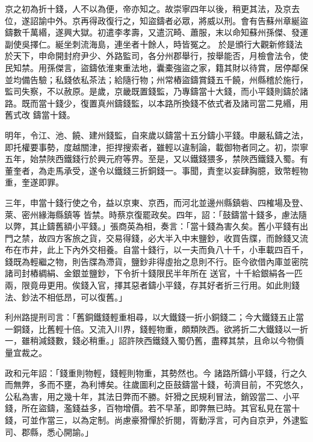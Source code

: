 \begin{pinyinscope}
 京之初為折十錢，人不以為便，帝亦知之。故崇寧四年以後，稍更其法，及京去位，遂詔諭中外。京再得政復行之，知盜鑄者必眾，將威以刑。會有告蘇州章綖盜鑄數千萬緡，遂興大獄。初遣李孝壽，又遣沉畸、蕭服，末以命知蘇州孫傑、發運副使吳擇仁。綖坐刺流海島，連坐者十餘人，時皆冤之。
 於是頒行大觀新修錢法於天下，申命開封府尹少、外路監司，各分州郡舉行，按舉能否，月檢會法令，使民知禁。用孫傑言，盜鑄依淮東重法地，囊橐強盜之家，籍其財以待賞，居停鄰保並均備告驗；私錢依私茶法；給隨行物；州常樁盜鑄賞錢五千饒，州縣稽於施行，監司失察，不以赦原。是歲，京畿既置錢監，乃專鑄當十大錢，而小平錢則鑄於諸路。既而當十錢少，復置真州鑄錢監，以本路所換錢不依式者及諸司當二見緡，用舊式改
 鑄當十錢。



 明年，令江、池、饒、建州錢監，自來歲以鑄當十五分鑄小平錢。申嚴私鑄之法，即托權要事勢，度越關津，拒捍搜索者，雖輕以違制論，載御物者同之。初，崇寧五年，始禁陜西鐵錢行於興元府等界。至是，又以鐵錢猥多，禁陜西鐵錢入蜀。有董奎者，為走馬承受，遂令以鐵錢三折銅錢一。事聞，責奎以妄肆胸臆，致幣輕物重，奎遂即罪。



 三年，申當十錢行使之令，益以京東、京西，而河北並邊州縣鎮砦、四榷場及登、萊、密州緣海縣鎮等
 皆禁。時蔡京復罷政矣。四年，詔：「鼓鑄當十錢多，慮法隨以弊，其止鑄舊額小平錢。」張商英為相，奏言：「當十錢為害久矣。舊小平錢有出門之禁，故四方客旅之貨，交易得錢，必大半入中末鹽鈔，收買告牒，而餘錢又流布在市井，此上下內外交相養。自當十錢行，以一夫而負八十千，小車載四百千，錢既為輕繼之物，則告牒為滯貨，鹽鈔非得虛抬之息則不行。臣今欲借內庫並密院諸司封樁綢絹、金銀並鹽鈔，下令折十錢限民半年所在
 送官，十千給銀絹各一匹兩，限竟毋更用。俟錢入官，擇其惡者鑄小平錢，存其好者折三行用。如此則錢法、鈔法不相低昂，可以復舊。」



 利州路提刑司言：「舊銅鐵錢輕重相尋，以大鐵錢一折小銅錢二；今大鐵錢五止當一銅錢，比舊輕十倍。又流入川界，錢輕物重，頗類陜西。欲將折二大鐵錢以一折一，雖稍減錢數，錢必稍重。」詔許陜西鐵錢入蜀仍舊，盡釋其禁，且命以今物價量宜裁之。



 政和元年詔：「錢重則物輕，錢輕則物重，其勢然也。今
 諸路所鑄小平錢，行之久而無弊，多而不壅，為利博矣。往歲圖利之臣鼓鑄當十錢，茍濟目前，不究悠久，公私為害，用之幾十年，其法日弊而不勝。奸猾之民規利冒法，銷毀當二、小平錢，所在盜鑄，濫錢益多，百物增價。若不早革，即弊無已時。其官私見在當十錢，可並作當三，以為定制。尚慮豪猾憚於折閱，胥動浮言，可內自京尹，外逮監司、郡縣，悉心開諭。」




\end{pinyinscope}
